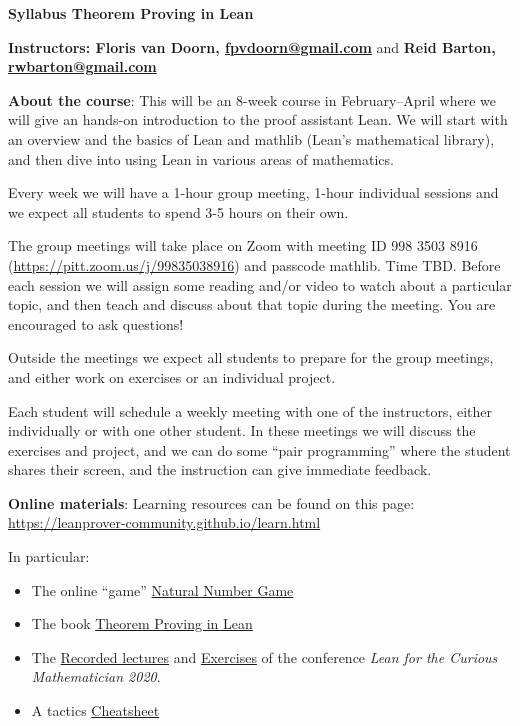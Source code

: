 \documentclass[10pt]{article}
\begin{document}
\mbox{}\vspace*{-15mm}
\begin{center}
{\large\bf Syllabus Theorem Proving in Lean}

{\bf Instructors: Floris van Doorn, \url{fpvdoorn@gmail.com}} and {\bf Reid Barton, \url{rwbarton@gmail.com }}
\end{center}

\textbf{About the course}:
This will be an 8-week course in February--April where we will give an hands-on introduction to the proof assistant Lean. We will start with an overview and the basics of Lean and \textsf{mathlib} (Lean's mathematical library), and then dive into using Lean in various areas of mathematics.

Every week we will have a 1-hour group meeting, 1-hour individual sessions and we expect all students to spend 3-5 hours on their own.

The group meetings will take place on Zoom with meeting ID 998 3503 8916 (\url{https://pitt.zoom.us/j/99835038916}) and passcode \textsf{mathlib}. Time TBD. Before each session we will assign some reading and/or video to watch about a particular topic, and then teach and discuss about that topic during the meeting. You are encouraged to ask questions!

Outside the meetings we expect all students to prepare for the group meetings, and either work on exercises or an individual project.

Each student will schedule a weekly meeting with one of the instructors, either individually or with one other student. In these meetings we will discuss the exercises and project, and we can do some ``pair programming'' where the student shares their screen, and the instruction can give immediate feedback.

\textbf{Online materials}:
Learning resources can be found on this page: \url{https://leanprover-community.github.io/learn.html}

In particular:
\begin{itemize}
\item The online ``game'' \href{http://wwwf.imperial.ac.uk/~buzzard/xena/natural_number_game/}{Natural Number Game}
\item The book \href{https://leanprover.github.io/theorem_proving_in_lean/}{Theorem Proving in Lean}
\item The \href{https://www.youtube.com/playlist?list=PLlF-CfQhukNlxexiNJErGJd2dte_J1t1N}{Recorded lectures} and \href{https://leanprover-community.github.io/lftcm2020/exercises.html}{Exercises} of the conference \emph{Lean for the Curious Mathematician 2020}.
\item A tactics \href{https://leanprover-community.github.io//img/lean-tactics.pdf}{Cheatsheet}
\end{itemize}
\end{document}
